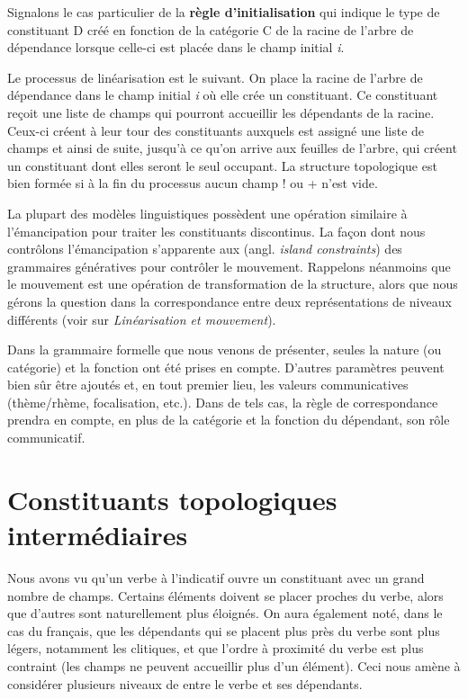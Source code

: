 {\begin{enumerate}
    \ea
    \z
    \end{enumerate}
    Signalons le cas particulier de la \textbf{règle d’initialisation} qui indique le type de constituant D créé en fonction de la catégorie C de la racine de l’arbre de dépendance lorsque celle-ci est placée dans le champ initial \textit{i}.

    Le processus de linéarisation est le suivant. On place la racine de l’arbre de dépendance dans le champ initial \textit{i} où elle crée un constituant. Ce constituant reçoit une liste de champs qui pourront accueillir les dépendants de la racine. Ceux-ci créent à leur tour des constituants auxquels est assigné une liste de champs et ainsi de suite, jusqu’à ce qu’on arrive aux feuilles de l’arbre, qui créent un constituant dont elles seront le seul occupant. La structure topologique est bien formée si à la fin du processus aucun champ ! ou + n’est vide.

    La plupart des modèles linguistiques possèdent une opération similaire à l’émancipation pour traiter les constituants discontinus. La façon dont nous contrôlons l’émancipation s’apparente aux  (angl. \textit{island constraints}) des grammaires génératives pour contrôler le mouvement. Rappelons néanmoins que le mouvement est une opération de transformation de la structure, alors que nous gérons la question dans la correspondance entre deux représentations de niveaux différents (voir  sur \textit{Linéarisation et mouvement}).

    Dans la grammaire formelle que nous venons de présenter, seules la nature (ou catégorie) et la fonction ont été prises en compte. D’autres paramètres peuvent bien sûr être ajoutés et, en tout premier lieu, les valeurs communicatives (thème/rhème, focalisation, etc.). Dans de tels cas, la règle de correspondance prendra en compte, en plus de la catégorie et la fonction du dépendant, son rôle communicatif.
}
\section{Constituants topologiques intermédiaires}\label{sec:3.5.34}

Nous avons vu qu’un verbe à l’indicatif ouvre un constituant avec un grand nombre de champs. Certains éléments doivent se placer proches du verbe, alors que d’autres sont naturellement plus éloignés. On aura également noté, dans le cas du français, que les dépendants qui se placent plus près du verbe sont plus légers, notamment les clitiques, et que l’ordre à proximité du verbe est plus contraint (les champs ne peuvent accueillir plus d’un élément). Ceci nous amène à considérer plusieurs niveaux de  entre le verbe et ses dépendants.

